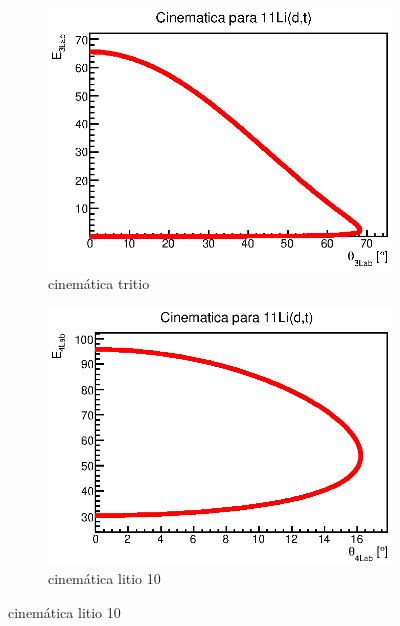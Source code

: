 \documentclass[12pt,a4paper]{article}
\numberwithin{equation}{section}
\numberwithin{figure}{section}
\begin{document}
\begin{figure}[h!] \centering
    \begin{subfigure}[b]{0.45\linewidth} \centering
        \includegraphics[scale=0.8]{CinematicaH.eps}
        \caption{cinemática tritio}
        \label{Fig:2.2.01-hidrogeno}
    \end{subfigure}
    \begin{subfigure}[b]{0.45\linewidth} \centering
        \includegraphics[scale=0.8]{Cinematica11Li.eps}
        \caption{cinemática litio 10}
        \label{Fig:2.2.01-litio}
    \end{subfigure}
\end{figure}
    
\end{document}
